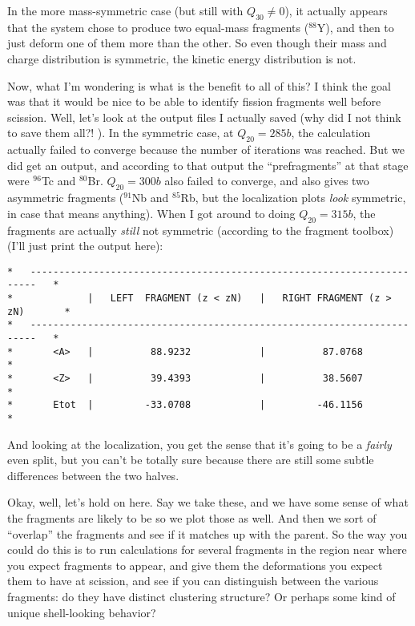 \documentclass[]{report}
\begin{document}
In the more mass-symmetric case (but still with $Q_{30}\neq0$), it actually appears that the system chose to produce two equal-mass fragments ($^{88}$Y), and then to just deform one of them more than the other. So even though their mass and charge distribution is symmetric, the kinetic energy distribution is not.

Now, what I'm wondering is what is the benefit to all of this? I think the goal was that it would be nice to be able to identify fission fragments well before scission. Well, let's look at the output files I actually saved (why did I not think to save them all?! \frown). In the symmetric case, at $Q_{20}=285b$, the calculation actually failed to converge because the number of iterations was reached. But we did get an output, and according to that output the ``prefragments'' at that stage were $^{96}$Tc and $^{80}$Br. $Q_{20}=300b$ also failed to converge, and also gives two asymmetric fragments ($^{91}$Nb and $^{85}$Rb, but the localization plots \textit{look} symmetric, in case that means anything). When I got around to doing $Q_{20}=315b$, the fragments are actually \textit{still} not symmetric (according to the fragment toolbox) (I'll just print the output here):
\begin{verbatim}
*   -----------------------------------------------------------------------   *
*             |   LEFT  FRAGMENT (z < zN)   |   RIGHT FRAGMENT (z > zN)       *
*   -----------------------------------------------------------------------   *
*       <A>   |          88.9232            |          87.0768                *
*       <Z>   |          39.4393            |          38.5607                *
*       Etot  |         -33.0708            |         -46.1156                *
\end{verbatim}

\noindent And looking at the localization, you get the sense that it's going to be a \textit{fairly} even split, but you can't be totally sure because there are still some subtle differences between the two halves.

Okay, well, let's hold on here. Say we take these, and we have some sense of what the fragments are likely to be so we plot those as well. And then we sort of ``overlap'' the fragments and see if it matches up with the parent. So the way you could do this is to run calculations for several fragments in the region near where you expect fragments to appear, and give them the deformations you expect them to have at scission, and see if you can distinguish between the various fragments: do they have distinct clustering structure? Or perhaps some kind of unique shell-looking behavior?
\end{document}
